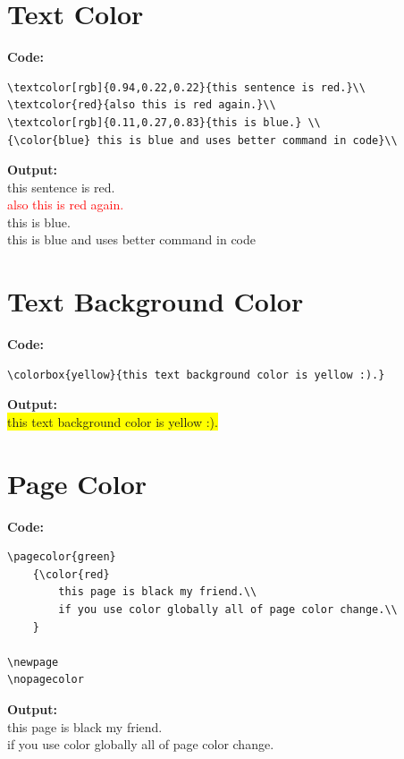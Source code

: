 \documentclass{book}
\newcommand{\myc}{\noindent\textbf{{\color{blue} Code}:}}
\newcommand{\myo}{\noindent\textbf{{\color{blue} Output}:\\}}
\begin{document}
\section{Text Color}
\myc
\begin{lstlisting}
\textcolor[rgb]{0.94,0.22,0.22}{this sentence is red.}\\
\textcolor{red}{also this is red again.}\\
\textcolor[rgb]{0.11,0.27,0.83}{this is blue.} \\
{\color{blue} this is blue and uses better command in code}\\
\end{lstlisting}

\myo
\textcolor[rgb]{0.94,0.22,0.22}{this sentence is red.}\\
\textcolor{red}{also this is red again.}\\
\textcolor[rgb]{0.11,0.27,0.83}{this is blue.} \\
{\color{blue} this is blue and uses better command in code}\\

\section{Text Background Color}
\myc
\begin{lstlisting}
\colorbox{yellow}{this text background color is yellow :).}
\end{lstlisting}

\myo
\colorbox{yellow}{this text background color is yellow :).}

\newpage
\section{Page Color}
\myc
\begin{lstlisting}
\pagecolor{green}
    {\color{red}
        this page is black my friend.\\
        if you use color globally all of page color change.\\
    }

\newpage
\nopagecolor
\end{lstlisting}

\myo
\pagecolor{green}
    {\color{red}
        this page is black my friend.\\
        if you use color globally all of page color change.\\
    }

\newpage
\nopagecolor
\end{document}
